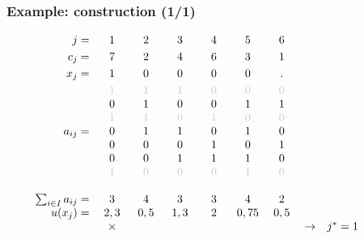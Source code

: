 \documentclass[]{beamer}
\newcommand{\grisc}[1]{\color{black!20}#1}
\begin{document}
\begin{frame}
  \frametitle{Example: construction (1/1)}
\vspace{3mm}

{\small

$
\begin{array}{r cccccccl}
%
j =   & 1 & 2 & 3 & 4 & 5 & 6 \vspace{1mm}\\
c_j =   & 7 & 2 & 4 &  6 & 3 & 1 \vspace{1mm}\\	
x_j =   & 1 & 0 & 0 & 0 & 0 & . \vspace{1mm}\\	
  & {\grisc 1} & {\grisc 1} & {\grisc 1} &  {\grisc 0} & {\grisc 0} & {\grisc 0}  \\
  & {0} & { 1} & { 0} &  { 0} & { 1} & { 1}  \\  
  & {\grisc 1} & {\grisc 1} & {\grisc 0} &  {\grisc 1} & {\grisc 0} & {\grisc 0}  \\ 
a_{ij} =  & { 0} & { 1} & { 1} &  { 0} & { 1} & { 0}  \\ 
  & 0 & 0 & 0 &  1 & 0 & 1  \\ 
  & 0 & 0 & 1 &  1 & 1 & 0  \\       
  &  {\grisc 1}  & {\grisc 0} & {\grisc 0} &   {\grisc 0}  & {\grisc 1} & {\grisc 0}  \\
  \\
\qquad \sum_{i\in I} a_{ij} = &	3 &	4 &	3 &	3 &	4 &	2 \\	
u(x_j) = &	2,3 & 0,5 &  1,3 & 2 &  0,75 & 0,5 \\	
               & \times &  &  &  &  &  &  \rightarrow & j^{*} =   1 \vspace{1mm} \\  
\quad & \qquad & \qquad & \qquad & \qquad & \qquad & \qquad & \\
\\ %
\end{array}
$ 
}
 

\end{frame}

%
%
\end{document}
